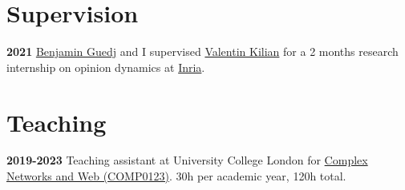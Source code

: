 \documentclass[a4paper,12pt]{article}
\begin{document}






\section*{Supervision}
\textbf{2021} \href{https://bguedj.github.io/}{Benjamin Guedj} and I supervised \href{https://valentinkil.github.io/}{Valentin Kilian} for a 2 months research internship on opinion dynamics at \href{https://www.inria.fr/en}{Inria}.


\section*{Teaching}
\textbf{2019-2023} Teaching assistant at University College London for \href{https://www.ucl.ac.uk/module-catalogue/modules/complex-networks-and-web/COMP0123}{Complex Networks and Web (COMP0123)}. 30h per academic year, 120h total.
\end{document}
